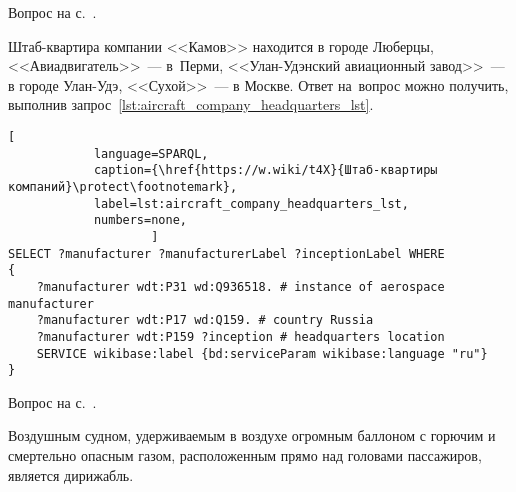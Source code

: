 \begin{task}
    \label{answer:aircraft_company_headquarters}
    \AnswerBackref Вопрос на с.~\pageref{aircraft_question_3}.

Штаб-квартира компании <<Камов>> находится в городе Люберцы, 
    <<Авиадвигатель>>~--- в~Перми, 
    <<Улан-Удэнский авиационный завод>>~--- в городе Улан-Удэ, 
    <<Сухой>>~--- в Москве. 
    Ответ на~вопрос можно получить, выполнив запрос~\ref{lst:aircraft_company_headquarters_lst}. 
   

\newpage
\begin{lstlisting}[ 
            language=SPARQL, 
            caption={\href{https://w.wiki/t4X}{Штаб-квартиры компаний}\protect\footnotemark}, 
            label=lst:aircraft_company_headquarters_lst, 
            numbers=none,
                    ]
SELECT ?manufacturer ?manufacturerLabel ?inceptionLabel WHERE
{
    ?manufacturer wdt:P31 wd:Q936518. # instance of aerospace manufacturer
  	?manufacturer wdt:P17 wd:Q159. # country Russia
  	?manufacturer wdt:P159 ?inception # headquarters location
    SERVICE wikibase:label {bd:serviceParam wikibase:language "ru"}
}
\end{lstlisting}
\end{task}


\begin{task}
    \label{answer:aircraft_question_airship}
    \AnswerBackref Вопрос на с.~\pageref{aircraft_question_4}.

Воздушным судном, удерживаемым в воздухе огромным баллоном 
    с горючим и смертельно опасным газом, 
    расположенным прямо над головами пассажиров, является дирижабль. 
\end{task}



